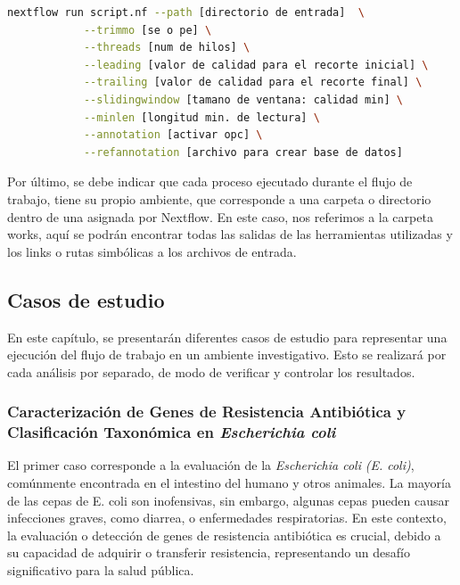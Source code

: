 \documentclass[12pt]{article}
\begin{document}
\begin{center}
    \begin{lstlisting}[language=bash, caption=Comando para la ejecución de una anotación funcional \emph{(elaboración propia)}., label=lst:ANNOTATION]
        nextflow run script.nf --path [directorio de entrada]  \
            --trimmo [se o pe] \
            --threads [num de hilos] \
            --leading [valor de calidad para el recorte inicial] \
            --trailing [valor de calidad para el recorte final] \
            --slidingwindow [tamano de ventana: calidad min] \
            --minlen [longitud min. de lectura] \
            --annotation [activar opc] \
            --refannotation [archivo para crear base de datos]
    \end{lstlisting}
\end{center}

Por último, se debe indicar que cada proceso ejecutado durante el flujo de trabajo, 
tiene su propio ambiente, que corresponde a una carpeta o directorio dentro de una 
asignada por Nextflow. En este caso, nos referimos a la carpeta works, aquí se podrán 
encontrar todas las salidas de las herramientas utilizadas y los links o rutas 
simbólicas a los archivos de entrada.

\subsection{Casos de estudio}

En este capítulo, se presentarán diferentes casos de estudio para representar una 
ejecución del flujo de trabajo en un ambiente investigativo. Esto se realizará por 
cada análisis por separado, de modo de verificar y controlar los resultados.

\subsubsection*{Caracterización de Genes de Resistencia Antibiótica y Clasificación 
Taxonómica en \textit{Escherichia coli}}

El primer caso corresponde a la evaluación de la 
\textit{Escherichia coli} \emph{(E. coli)}, comúnmente encontrada en el 
intestino del humano y otros animales. La mayoría de las cepas de 
E. coli son inofensivas, sin embargo, algunas cepas pueden causar 
infecciones graves, como diarrea, o enfermedades respiratorias. 
En este contexto, la evaluación o detección de genes de resistencia 
antibiótica es crucial, debido a su capacidad de adquirir o transferir 
resistencia, representando un desafío significativo para la salud 
pública.
\end{document}
